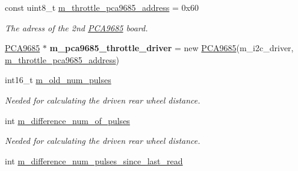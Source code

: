 \begin{DoxyCompactItemize}
\mbox{\label{classfennec__ns_1_1_fennec_h_w_interface_a515996ba43ee57670c6275b560997876}} 
const uint8\+\_\+t \hyperlink{classfennec__ns_1_1_fennec_h_w_interface_a515996ba43ee57670c6275b560997876}{m\+\_\+throttle\+\_\+pca9685\+\_\+address} = 0x60
\begin{DoxyCompactList}\small\item\em The adress of the 2nd \hyperlink{class_p_c_a9685}{P\+C\+A9685} board. \end{DoxyCompactList}\item 
\mbox{\label{classfennec__ns_1_1_fennec_h_w_interface_a6a6def1f04ecb0ca88b659aca69cfa60}} 
\hyperlink{class_p_c_a9685}{P\+C\+A9685} $\ast$ {\bfseries m\+\_\+pca9685\+\_\+throttle\+\_\+driver} = new \hyperlink{class_p_c_a9685}{P\+C\+A9685}(m\+\_\+i2c\+\_\+driver, \hyperlink{classfennec__ns_1_1_fennec_h_w_interface_a515996ba43ee57670c6275b560997876}{m\+\_\+throttle\+\_\+pca9685\+\_\+address})
\item 
\mbox{\label{classfennec__ns_1_1_fennec_h_w_interface_ab1ca5a0a877c3bd02fcc2c93c8b85e60}} 
int16\+\_\+t \hyperlink{classfennec__ns_1_1_fennec_h_w_interface_ab1ca5a0a877c3bd02fcc2c93c8b85e60}{m\+\_\+old\+\_\+num\+\_\+pulses}
\begin{DoxyCompactList}\small\item\em Needed for calculating the driven rear wheel distance. \end{DoxyCompactList}\item 
\mbox{\label{classfennec__ns_1_1_fennec_h_w_interface_a117444fd6f01a83c603bc3ff6b7a3ffe}} 
int \hyperlink{classfennec__ns_1_1_fennec_h_w_interface_a117444fd6f01a83c603bc3ff6b7a3ffe}{m\+\_\+difference\+\_\+num\+\_\+of\+\_\+pulses}
\begin{DoxyCompactList}\small\item\em Needed for calculating the driven rear wheel distance. \end{DoxyCompactList}\item 
\mbox{\label{classfennec__ns_1_1_fennec_h_w_interface_a2ff004471cd398edf8ab25e0e34d8f2e}} 
int \hyperlink{classfennec__ns_1_1_fennec_h_w_interface_a2ff004471cd398edf8ab25e0e34d8f2e}{m\+\_\+difference\+\_\+num\+\_\+pulses\+\_\+since\+\_\+last\+\_\+read}

\end{DoxyCompactItemize}
